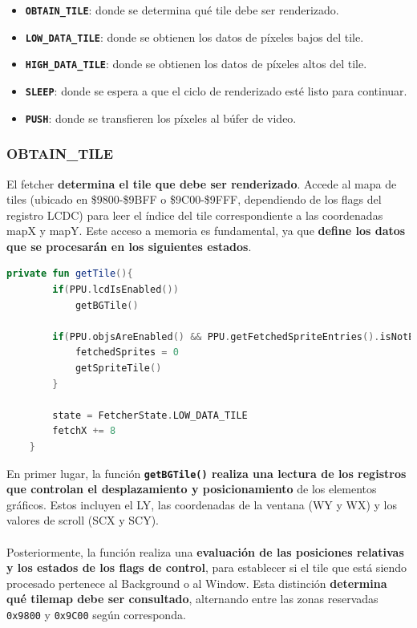 \begin{itemize}
    \item \textbf{\texttt{OBTAIN\_TILE}}: donde se determina qué tile debe ser renderizado.
    \item \textbf{\texttt{LOW\_DATA\_TILE}}: donde se obtienen los datos de píxeles bajos del tile.
    \item \textbf{\texttt{HIGH\_DATA\_TILE}}: donde se obtienen los datos de píxeles altos del tile.
    \item \textbf{\texttt{SLEEP}}: donde se espera a que el ciclo de renderizado esté listo para continuar.
    \item \textbf{\texttt{PUSH}}: donde se transfieren los píxeles al búfer de video.
\end{itemize}

\subsubsection{OBTAIN\_TILE}
El fetcher \textbf{determina el tile que debe ser renderizado}. Accede al mapa de tiles (ubicado en \$9800-\$9BFF o \$9C00-\$9FFF, dependiendo de los flags del registro LCDC) para leer el índice del tile correspondiente a las coordenadas mapX y mapY. Este acceso a memoria es fundamental, ya que \textbf{define los datos que se procesarán en los siguientes estados}.

\begin{lstlisting}[language=Kotlin, caption={FIFO Fetcher - Obtención de Tile.}, label={code:ppufifogettile}]
    private fun getTile(){
        if(PPU.lcdIsEnabled())
            getBGTile()

        if(PPU.objsAreEnabled() && PPU.getFetchedSpriteEntries().isNotEmpty()) {
            fetchedSprites = 0
            getSpriteTile()
        }

        state = FetcherState.LOW_DATA_TILE
        fetchX += 8
    }
\end{lstlisting}

En primer lugar, la función \textbf{\texttt{getBGTile()} realiza una lectura de los registros que controlan el desplazamiento y posicionamiento} de los elementos gráficos. Estos incluyen el LY, las coordenadas de la ventana (WY y WX) y los valores de scroll (SCX y SCY).
\\\\
Posteriormente, la función realiza una \textbf{evaluación de las posiciones relativas y los estados de los flags de control}, para establecer si el tile que está siendo procesado pertenece al Background o al Window. Esta distinción \textbf{determina qué tilemap debe ser consultado}, alternando entre las zonas reservadas \texttt{0x9800} y \texttt{0x9C00} según corresponda.

